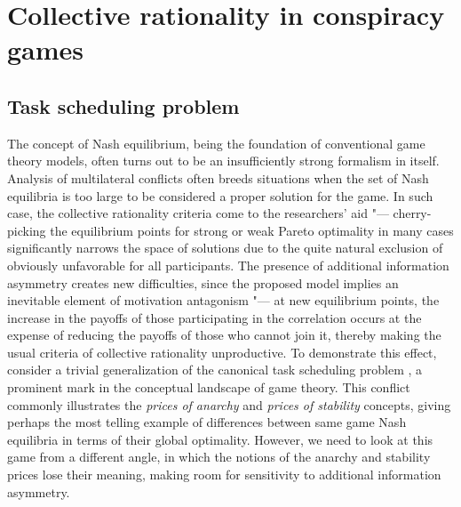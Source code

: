 \chapter{Collective rationality in conspiracy games}\label{ch:ch2}

\section{Task scheduling problem}\label{sec:ch2/sec1}

The concept of Nash equilibrium, being the foundation of conventional game theory models, often turns out to be an insufficiently strong formalism in itself. Analysis of multilateral conflicts often breeds situations when the set of Nash equilibria is too large to be considered a proper solution for the game. In such case, the collective rationality criteria come to the researchers' aid "--- cherry-picking the equilibrium points for strong or weak Pareto optimality in many cases significantly narrows the space of solutions due to the quite natural exclusion of obviously unfavorable for all participants. The presence of additional information asymmetry creates new difficulties, since the proposed model implies an inevitable element of motivation antagonism "--- at new equilibrium points, the increase in the payoffs of those participating in the correlation occurs at the expense of reducing the payoffs of those who cannot join it, thereby making the usual criteria of collective rationality unproductive. To demonstrate this effect, consider a trivial generalization of the canonical task scheduling problem \cite{Koutsoupias}, a prominent mark in the conceptual landscape of game theory. This conflict commonly illustrates the \emph{prices of anarchy} and \emph{prices of stability} concepts, giving perhaps the most telling example of differences between same game Nash equilibria in terms of their global optimality. However, we need to look at this game from a different angle, in which the notions of the anarchy and stability prices lose their meaning, making room for sensitivity to additional information asymmetry. %